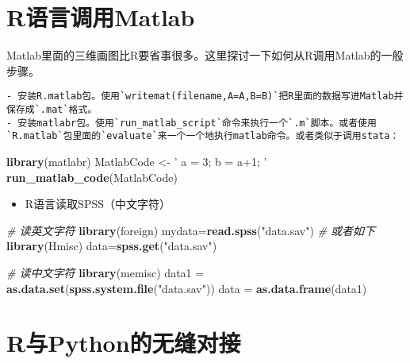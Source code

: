 \documentclass[
]{book}
\newenvironment{Shaded}{\begin{snugshade}}{\end{snugshade}}
\newcommand{\CommentTok}[1]{\textcolor[rgb]{0.56,0.35,0.01}{\textit{#1}}}
\newcommand{\KeywordTok}[1]{\textcolor[rgb]{0.13,0.29,0.53}{\textbf{#1}}}
\newcommand{\NormalTok}[1]{#1}
\newcommand{\StringTok}[1]{\textcolor[rgb]{0.31,0.60,0.02}{#1}}
\providecommand{\tightlist}{%
  \setlength{\itemsep}{0pt}\setlength{\parskip}{0pt}}
\begin{document}
\hypertarget{rux8bedux8a00ux8c03ux7528matlab}{%
\section{R语言调用Matlab}\label{rux8bedux8a00ux8c03ux7528matlab}}

Matlab里面的三维画图比R要省事很多。这里探讨一下如何从R调用Matlab的一般步骤。

\begin{verbatim}
- 安装R.matlab包。使用`writemat(filename,A=A,B=B)`把R里面的数据写进Matlab并保存成`.mat`格式。
- 安装matlabr包。使用`run_matlab_script`命令来执行一个`.m`脚本。或者使用`R.matlab`包里面的`evaluate`来一个一个地执行matlab命令。或者类似于调用stata：
\end{verbatim}

\begin{Shaded}
\begin{Highlighting}[]
    \KeywordTok{library}\NormalTok{(matlabr)}
\NormalTok{    MatlabCode <-}\StringTok{ '}
\StringTok{    a = 3;}
\StringTok{    b = a+1;}
\StringTok{    '}
    \KeywordTok{run_matlab_code}\NormalTok{(MatlabCode)}
\end{Highlighting}
\end{Shaded}

\begin{itemize}
\tightlist
\item
  R语言读取SPSS（中文字符）
\end{itemize}

\begin{Shaded}
\begin{Highlighting}[]
\CommentTok{# 读英文字符}
\KeywordTok{library}\NormalTok{(foreign)  }
\NormalTok{mydata=}\KeywordTok{read.spss}\NormalTok{(}\StringTok{"data.sav"}\NormalTok{)  }
\CommentTok{# 或者如下}
\KeywordTok{library}\NormalTok{(Hmisc)  }
\NormalTok{data=}\KeywordTok{spss.get}\NormalTok{(}\StringTok{"data.sav"}\NormalTok{) }

\CommentTok{# 读中文字符}
\KeywordTok{library}\NormalTok{(memisc)}
\NormalTok{data1 =}\StringTok{ }\KeywordTok{as.data.set}\NormalTok{(}\KeywordTok{spss.system.file}\NormalTok{(}\StringTok{"data.sav"}\NormalTok{))}
\NormalTok{data =}\StringTok{ }\KeywordTok{as.data.frame}\NormalTok{(data1)}
\end{Highlighting}
\end{Shaded}

\hypertarget{rux4e0epythonux7684ux65e0ux7f1dux5bf9ux63a5}{%
\section{R与Python的无缝对接}\label{rux4e0epythonux7684ux65e0ux7f1dux5bf9ux63a5}}
\end{document}
